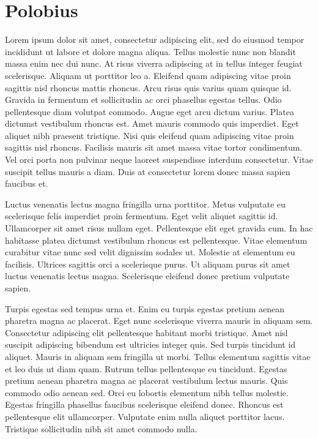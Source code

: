 \documentclass{rust-edu-workshop}
\begin{document}
\section{Polobius}

  Lorem ipsum dolor sit amet, consectetur adipiscing elit,
  sed do eiusmod tempor incididunt ut labore et dolore magna
  aliqua. Tellus molestie nunc non blandit massa enim nec
  dui nunc. At risus viverra adipiscing at in tellus integer
  feugiat scelerisque. Aliquam ut porttitor leo a. Eleifend
  quam adipiscing vitae proin sagittis nisl rhoncus mattis
  rhoncus. Arcu risus quis varius quam quisque id. Gravida
  in fermentum et sollicitudin ac orci phasellus egestas
  tellus. Odio pellentesque diam volutpat commodo. Augue
  eget arcu dictum varius. Platea dictumst vestibulum
  rhoncus est. Amet mauris commodo quis imperdiet. Eget
  aliquet nibh praesent tristique. Nisi quis eleifend quam
  adipiscing vitae proin sagittis nisl rhoncus. Facilisis
  mauris sit amet massa vitae tortor condimentum. Vel orci
  porta non pulvinar neque laoreet suspendisse interdum
  consectetur. Vitae suscipit tellus mauris a diam. Duis at
  consectetur lorem donec massa sapien faucibus et.

  Luctus venenatis lectus magna fringilla urna
  porttitor. Metus vulputate eu scelerisque felis imperdiet
  proin fermentum. Eget velit aliquet sagittis
  id. Ullamcorper sit amet risus nullam eget. Pellentesque
  elit eget gravida cum. In hac habitasse platea dictumst
  vestibulum rhoncus est pellentesque. Vitae elementum
  curabitur vitae nunc sed velit dignissim sodales
  ut. Molestie at elementum eu facilisis. Ultrices sagittis
  orci a scelerisque purus. Ut aliquam purus sit amet luctus
  venenatis lectus magna. Scelerisque eleifend donec pretium
  vulputate sapien.

  Turpis egestas sed tempus urna et. Enim eu turpis egestas
  pretium aenean pharetra magna ac placerat. Eget nunc
  scelerisque viverra mauris in aliquam sem. Consectetur
  adipiscing elit pellentesque habitant morbi
  tristique. Amet nisl suscipit adipiscing bibendum est
  ultricies integer quis. Sed turpis tincidunt id
  aliquet. Mauris in aliquam sem fringilla ut morbi. Tellus
  elementum sagittis vitae et leo duis ut diam quam. Rutrum
  tellus pellentesque eu tincidunt. Egestas pretium aenean
  pharetra magna ac placerat vestibulum lectus mauris. Quis
  commodo odio aenean sed. Orci eu lobortis elementum nibh
  tellus molestie. Egestas fringilla phasellus faucibus
  scelerisque eleifend donec. Rhoncus est pellentesque elit
  ullamcorper. Vulputate enim nulla aliquet porttitor
  lacus. Tristique sollicitudin nibh sit amet commodo nulla.
\end{document}
